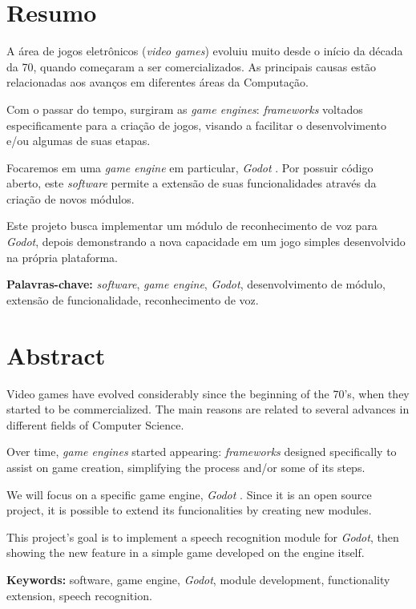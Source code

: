 
\chapter*{Resumo}

A área de jogos eletrônicos (\textit{video games}) evoluiu muito desde o início da década da 70, quando começaram a ser comercializados. As principais causas estão relacionadas aos avanços em diferentes áreas da Computação.

Com o passar do tempo, surgiram as \emph{game engines}: \textit{frameworks} voltados especificamente para a criação de jogos, visando a facilitar o desenvolvimento e/ou algumas de suas etapas.

Focaremos em uma \textit{game engine} em particular, \emph{Godot} \citep{godot}. Por possuir código aberto, este \textit{software} permite a extensão de suas funcionalidades através da criação de novos módulos.

Este projeto busca implementar um módulo de reconhecimento de voz para \textit{Godot}, depois demonstrando a nova capacidade em um jogo simples desenvolvido na própria plataforma.
\par
\bigskip
\noindent \textbf{Palavras-chave:} \textit{software}, \textit{game engine}, \textit{Godot}, desenvolvimento de módulo, extensão de funcionalidade, reconhecimento de voz.


\chapter*{Abstract}

Video games have evolved considerably since the beginning of the 70's, when they started to be commercialized. The main reasons are related to several advances in different fields of Computer Science.

Over time, \emph{game engines} started appearing: \textit{frameworks} designed specifically to assist on game creation, simplifying the process and/or some of its steps.

We will focus on a specific game engine, \emph{Godot} \citep{godot}. Since it is an open source project, it is possible to extend its funcionalities by creating new modules.

This project's goal is to implement a speech recognition module for \textit{Godot}, then showing the new feature in a simple game developed on the engine itself.
\par
\bigskip
\noindent \textbf{Keywords:} software, game engine, \textit{Godot}, module development, functionality extension, speech recognition.
